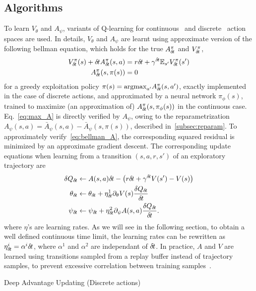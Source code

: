 \subsection{Algorithms}
\label{subsec:algorithm}
To learn $V_{\theta}$ and $A_{\psi}$, variants of Q-learning for continuous~\cite{ddpg} and
discrete~\cite{dqn} action spaces are used. In details, $V_{\theta}$ and $A_{\psi}$ are learnt
using approximate version of the following bellman equation, which holds for the true $A^\pi_{\delta\hspace{-.1em}t}$
and $V^\pi_{\delta\hspace{-.1em}t}$,
\begin{align}
	V^{\pi}_{\delta\hspace{-.1em}t}(s) + {\delta\hspace{-.1em}t} A^{\pi}_{\delta\hspace{-.1em}t}(s, a) &= r{\delta\hspace{-.1em}t} + \gamma^{{\delta\hspace{-.1em}t}}  \mathbb{E}_{s'} V^{\pi}_{\delta\hspace{-.1em}t}(s')\label{eq:bellman_A}\\
	A^{\pi}_{\delta\hspace{-.1em}t}(s, \pi(s)) &= 0\label{eq:max_A}
\end{align}
for a greedy exploitation policy $\pi(s) = \text{argmax}_{a'}A^\pi_{\delta\hspace{-.1em}t}(s,
a')$, exactly implemented in the case of discrete actions, and approximated by
a neural network $\pi_\phi(s)$, trained to maximize (an approximation of)
$A^\pi_{\delta\hspace{-.1em}t}(s, \pi_\phi(s))$ in the continuous case.  Eq.~\eqref{eq:max_A}
is directly verified by $A_{\psi}$, owing to the reparametrization
$A_\psi(s, a) = \bar{A}_\psi(s, a) - \bar{A}_\psi(s, \pi(s))$, described
in~\ref{subsec:reparam}.  To approximately verify~\eqref{eq:bellman_A}, the
corresponding squared residual is minimized by an approximate gradient descent.
The corresponding update equations when learning from a transition $(s, a, r, s')$ of
an exploratory trajectory are
\begin{align}
	\delta Q_{\delta\hspace{-.1em}t} &\leftarrow A(s, a) {\delta\hspace{-.1em}t} - \left(r {\delta\hspace{-.1em}t} + \gamma^{{\delta\hspace{-.1em}t}} V(s') - V(s)\right)\\
	\theta_{\delta\hspace{-.1em}t} &\leftarrow \theta_{\delta\hspace{-.1em}t} + \eta^1_{\delta\hspace{-.1em}t} \partial_{\theta} V(s) \frac{\delta Q_{\delta\hspace{-.1em}t}}{{\delta\hspace{-.1em}t}}\\
	\psi_{\delta\hspace{-.1em}t} &\leftarrow \psi_{\delta\hspace{-.1em}t} + \eta^2_{\delta\hspace{-.1em}t} \partial_{\psi} A(s, a) \frac{\delta Q_{\delta\hspace{-.1em}t}}{{\delta\hspace{-.1em}t}}.
	\label{eq:approx_bellman_A}
\end{align}
where $\eta$'s are learning rates. As we will see in the following section,
to obtain a well defined continuous time limit, the learning rates can be rewritten as
$\eta^i_{\delta\hspace{-.1em}t} = \alpha^i {\delta\hspace{-.1em}t}$, where $\alpha^1$ and $\alpha^2$ are independant
of ${\delta\hspace{-.1em}t}$. In practice, $A$ and $V$ are learned using
transitions sampled from a replay buffer instead of trajectory samples, to
prevent excessive correlation between training samples~\cite{dqn}.
\begin{algorithm}[ht]
	\caption{Deep Advantage Updating (Discrete actions)}
	
	\label{alg:dau}
\end{algorithm}


